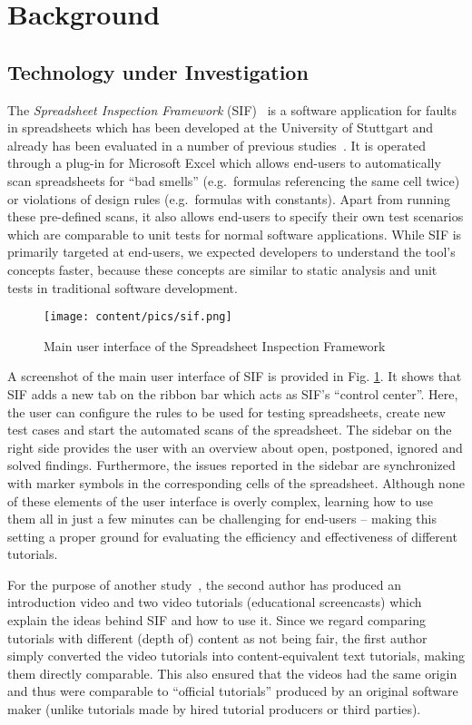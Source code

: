 \section{Background} 
\subsection{Technology under Investigation}
\label{subsec:technology}

The \textit{Spreadsheet Inspection Framework} (SIF)~\cite{sifei} is a software application for  faults in spreadsheets which has been developed at the University of Stuttgart and already has been evaluated in a number of previous studies~\cite{kulesz1,kulesz2,kulesz3}. It is operated through a plug-in for Microsoft Excel which allows end-users to automatically scan spreadsheets for \enquote{bad smells} (e.g.\ formulas referencing the same cell twice) or violations of design rules (e.g.\ formulas with constants). Apart from running these pre-defined scans, it also allows end-users to specify their own test scenarios which are comparable to unit tests for normal software applications. While SIF is primarily targeted at end-users, we expected developers to understand the tool's concepts faster, because these concepts are similar to static analysis and unit tests in traditional software development.

\begin{figure}
	\texttt{[image: content/pics/sif.png]}
	\caption{Main user interface of the Spreadsheet Inspection Framework}
	\label{fig:sif}
\end{figure}

A screenshot of the main user interface of SIF is provided in Fig. \ref{fig:sif}. It shows that SIF adds a new tab on the ribbon bar which acts as SIF's \enquote{control center}. Here, the user can configure the rules to be used for testing spreadsheets, create new test cases and start the automated scans of the spreadsheet. The sidebar on the right side provides the user with an overview about open, postponed, ignored and solved findings. Furthermore, the issues reported in the sidebar are synchronized with marker symbols in the corresponding cells of the spreadsheet. Although none of these elements of the user interface is overly complex, learning how to use them all in just a few minutes can be challenging for end-users -- making this setting a proper ground for evaluating the efficiency and effectiveness of different tutorials. 


For the purpose of another study~\cite{other_study}, the second author has produced an introduction video and two video tutorials (educational screencasts) which explain the ideas behind SIF and how to use it. Since we regard comparing tutorials with different (depth of) content as not being fair, the first author simply converted the video tutorials into content-equivalent text tutorials, making them directly comparable. This also ensured that the videos had the same origin and thus were comparable to \enquote{official tutorials} produced by an original software maker (unlike tutorials made by hired tutorial producers or third parties).


